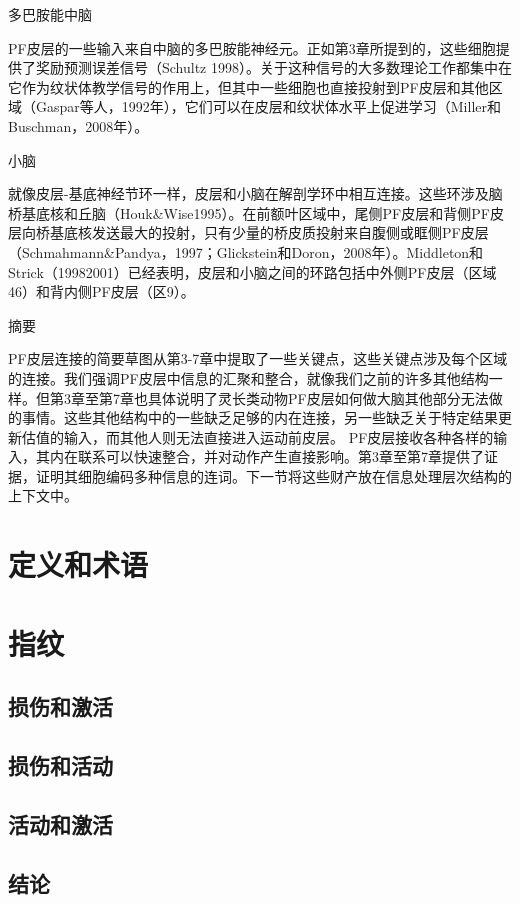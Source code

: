 多巴胺能中脑

PF皮层的一些输入来自中脑的多巴胺能神经元。正如第3章所提到的，这些细胞提供了奖励预测误差信号（Schultz 1998）。关于这种信号的大多数理论工作都集中在它作为纹状体教学信号的作用上，但其中一些细胞也直接投射到PF皮层和其他区域（Gaspar等人，1992年），它们可以在皮层和纹状体水平上促进学习（Miller和Buschman，2008年）。

小脑

就像皮层-基底神经节环一样，皮层和小脑在解剖学环中相互连接。这些环涉及脑桥基底核和丘脑（Houk\&Wise1995）。在前额叶区域中，尾侧PF皮层和背侧PF皮层向桥基底核发送最大的投射，只有少量的桥皮质投射来自腹侧或眶侧PF皮层（Schmahmann\&Pandya，1997；Glickstein和Doron，2008年）。Middleton和Strick（19982001）已经表明，皮层和小脑之间的环路包括中外侧PF皮层（区域46）和背内侧PF皮层（区9）。

摘要

PF皮层连接的简要草图从第3-7章中提取了一些关键点，这些关键点涉及每个区域的连接。我们强调PF皮层中信息的汇聚和整合，就像我们之前的许多其他结构一样。但第3章至第7章也具体说明了灵长类动物PF皮层如何做大脑其他部分无法做的事情。这些其他结构中的一些缺乏足够的内在连接，另一些缺乏关于特定结果更新估值的输入，而其他人则无法直接进入运动前皮层。
PF皮层接收各种各样的输入，其内在联系可以快速整合，并对动作产生直接影响。第3章至第7章提供了证据，证明其细胞编码多种信息的连词。下一节将这些财产放在信息处理层次结构的上下文中。


\section{定义和术语}


\section{指纹}

\subsection{损伤和激活}

\subsection{损伤和活动}

\subsection{活动和激活}




\subsection{结论}


